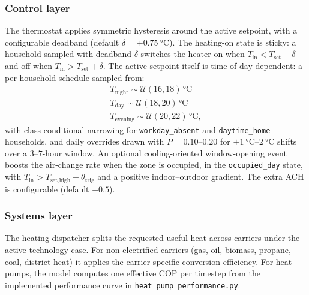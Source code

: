 \subsubsection*{Control layer}
The thermostat applies symmetric hysteresis around the active setpoint, with a configurable deadband (default $\delta = \pm \SI{0.75}{\celsius}$). The heating-on state is sticky: a household sampled with deadband $\delta$ switches the heater on when $T_{\text{in}} < T_{\text{set}} - \delta$ and off when $T_{\text{in}} > T_{\text{set}} + \delta$. The active setpoint itself is time-of-day-dependent: a per-household schedule sampled from:
\begin{align*}
    T_{\text{night}} \sim \mathcal{U}(16,18)\,\si{\celsius}\\
    T_{\text{day}} \sim \mathcal{U}(18,20)\,\si{\celsius}\\
    T_{\text{evening}} \sim \mathcal{U}(20,22)\,\si{\celsius},
\end{align*}
with class-conditional narrowing for \texttt{workday\_absent} and \texttt{daytime\_home} households, and daily overrides drawn with $P=0.10$--$0.20$ for $\pm\SI{1}{\celsius}$--$\SI{2}{\celsius}$ shifts over a $3$--$7$-hour window.
\newline An optional cooling-oriented window-opening event boosts the air-change rate when the zone is occupied, in the \texttt{occupied\_day} state, with $T_{\text{in}} > T_{\text{set,high}} + \theta_{\text{trig}}$ and a positive indoor--outdoor gradient. The extra ACH is configurable (default $+0.5$).

\subsubsection*{Systems layer}
The heating dispatcher splits the requested useful heat across carriers under the active technology case. For non-electrified carriers (gas, oil, biomass, propane, coal, district heat) it applies the carrier-specific conversion efficiency. For heat pumps, the model computes one effective COP per timestep from the implemented performance curve in \texttt{heat\_pump\_performance.py}.

